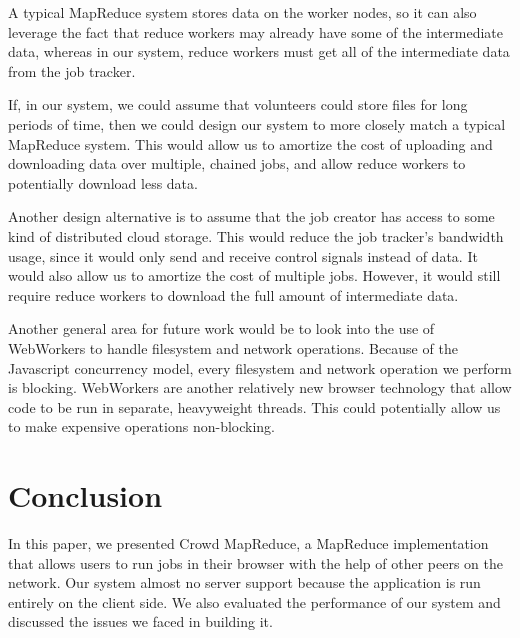 \documentclass{article} %
\begin{document}
A typical MapReduce system stores data on the worker nodes, so it can also
leverage the fact that reduce workers may already have some of the intermediate
data, whereas in our system, reduce workers must get all of the intermediate
data from the job tracker.

If, in our system, we could assume that volunteers could store files for long
periods of time, then we could design our system to more closely match a typical
MapReduce system. This would allow us to amortize the cost of uploading and
downloading data over multiple, chained jobs, and allow reduce workers to
potentially download less data.

Another design alternative is to assume that the job creator has access to some
kind of distributed cloud storage. This would reduce the job tracker's
bandwidth usage, since it would only send and receive control signals instead
of data. It would also allow us to amortize the cost of multiple jobs. However,
it would still require reduce workers to download the full amount of
intermediate data.

Another general area for future work would be to look into the use of WebWorkers
to handle filesystem and network operations. Because of the Javascript
concurrency model, every filesystem and network operation we perform is
blocking. WebWorkers are another relatively new browser technology that allow
code to be run in separate, heavyweight threads. This could potentially allow us
to make expensive operations non-blocking.

\section{Conclusion}
In this paper, we presented Crowd MapReduce, a MapReduce implementation that
allows users to run jobs in their browser with the help of other peers on the
network. Our system almost no server support because the application is run
entirely on the client side. We also evaluated the performance of our system and
discussed the issues we faced in building it.



\end{document}
